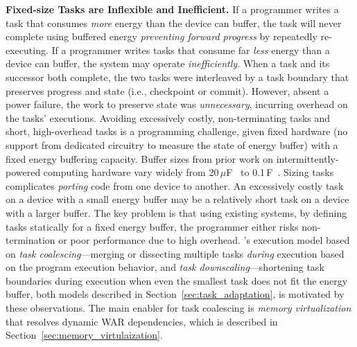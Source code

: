 \textbf{Fixed-size Tasks are Inflexible and Inefficient.} If a programmer writes a task that consumes {\em more} energy than the device can buffer, the task will never complete using buffered energy {\em preventing forward progress} by repeatedly re-executing. If a programmer writes tasks that consume far {\em less} energy than a device can buffer, the system may operate {\em inefficiently}. When a task and its successor both complete, the two tasks were interleaved by a task boundary that preserves progress and state (i.e., checkpoint or commit). However, absent a power failure, the work to preserve state was {\em unnecessary}, incurring overhead on the tasks' executions. Avoiding excessively costly, non-terminating tasks and short, high-overhead tasks is a programming challenge, given fixed hardware (no support from dedicated circuitry to measure the state of energy buffer) with a fixed energy buffering capacity. Buffer sizes from prior work on intermittently-powered computing hardware vary widely from 20\,$\mu $F~\cite{rodriguez_tbcs_2015} to 0.1\,F~\cite{moo}. Sizing tasks complicates {\em porting} code from one device to another. An excessively costly task on a device with a small energy buffer may be a relatively short task on a device with a larger buffer. The key problem is that using existing systems, by defining tasks statically for a fixed energy buffer, the programmer either risks non-termination or poor performance due to high overhead. \sys's execution model based on {\em task coalescing}---merging or dissecting multiple tasks {\em during} execution based on the program execution behavior, and {\em task downscaling}---shortening task boundaries during execution when even the smallest task does not fit the energy buffer, both models described in Section~\ref{sec:task_adaptation}, is motivated by these observations. The main enabler for task coalescing is \emph{memory virtualization} that resolves dynamic WAR dependencies, which is described in Section~\ref{sec:memory_virtulaization}.

